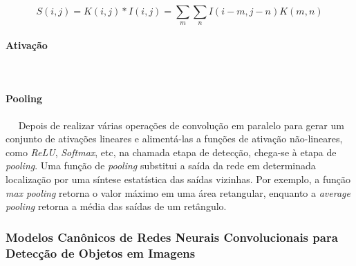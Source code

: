 \begin{equation}\label{eq:conv_img_eq}
	S(i,j) = K(i,j)*I(i,j) = \sum_{m}\sum_{n}I(i-m,j-n)K(m,n)
\end{equation}



\paragraph{Ativação}
\ \ \newline

\paragraph{Pooling}
\ \ \newline
Depois de realizar várias operações de convolução em paralelo para gerar um conjunto de ativações lineares e alimentá-las a funções de ativação não-lineares, como \emph{ReLU}, \emph{Softmax}, etc, na chamada etapa de detecção, chega-se à etapa de \emph{pooling}. Uma função de \emph{pooling} substitui a saída da rede em determinada localização por uma síntese estatística das saídas vizinhas. Por exemplo, a função \emph{max pooling} retorna o valor máximo em uma área retangular, enquanto a \emph{average pooling} retorna a média das saídas de um retângulo. %


\subsubsection{Modelos Canônicos de Redes Neurais Convolucionais para Detecção de Objetos em Imagens} \label{subsubsec:modelos_canonicos}
